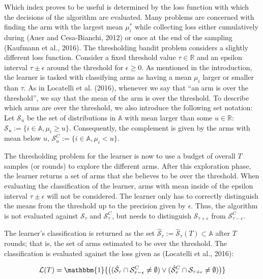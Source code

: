 \documentclass[11pt,]{article}
\begin{document}
Which index proves to be useful is determined by the loss function with
which the decisions of the algorithm are evaluated. Many problems are
concerned with finding the arm with the largest mean \(\mu_i^*\) while
collecting loss either cumulatively during (Auer and Cesa-Bianchi, 2012)
or once at the end of the sampling (Kaufmann et al., 2016). The
thresholding bandit problem considers a slightly different loss
function. Consider a fixed threshold value \(\tau \in \mathbb{R}\) and
an epsilon interval \(\tau \pm \epsilon\) around the threshold for
\(\epsilon \geq 0\). As mentioned in the introduction, the learner is
tasked with classifying arms as having a mean \(\mu_i\) larger or
smaller than \(\tau\). As in Locatelli et al. (2016), whenever we say
that ``an arm is over the threshold'', we say that the mean of the arm
is over the threshold. To describe which arms are over the threshold, we
also introduce the following set notation: Let \(\mathcal{S}_{u}\) be
the set of distributions in \(\mathbb{A}\) with mean larger than some
\(u \in \mathbb{R}\):
\(\mathcal{S}_{u} := \{i \in \mathbb{A}, \mu_i \geq u\}\). Consequently,
the complement is given by the arms with mean below \(u\),
\(\mathcal{S}^C_{u} := \{i \in \mathbb{A}, \mu_i < u\}\).

The thresholding problem for the learner is now to use a budget of
overall \(T\) samples (or rounds) to explore the different arms. After
this exploration phase, the learner returns a set of arms that she
believes to be over the threshold. When evaluating the classification of
the learner, arms with mean inside of the epsilon interval
\(\tau \pm \epsilon\) will not be considered. The learner only has to
correctly distinguish the means from the threshold up to the precision
given by \(\epsilon\). Thus, the algorithm is not evaluated against
\(\mathcal{S}_{\tau}\) and \(\mathcal{S}^C_{\tau}\), but needs to
distinguish \(\mathcal{S}_{\tau+\epsilon}\) from
\(\mathcal{S}^C_{\tau-\epsilon}\).

The learner's classification is returned as the set
\(\hat{\mathcal{S}}_{\tau} := \hat{\mathcal{S}}_{\tau}(T) \subset \mathbb{A}\)
after \(T\) rounds; that is, the set of arms estimated to be over the
threshold. The classification is evaluated against the loss given as
(Locatelli et al., 2016):

\[
\mathcal{L}(T) = \mathbbm{1}{\big((\hat{\mathcal{S}}_{\tau} \cap \mathcal{S}_{\tau-\epsilon}^C \neq \emptyset) \lor (\hat{\mathcal{S}}_{\tau}^C \cap \mathcal{S}_{\tau+\epsilon} \neq \emptyset)\big)}
\]
\end{document}
